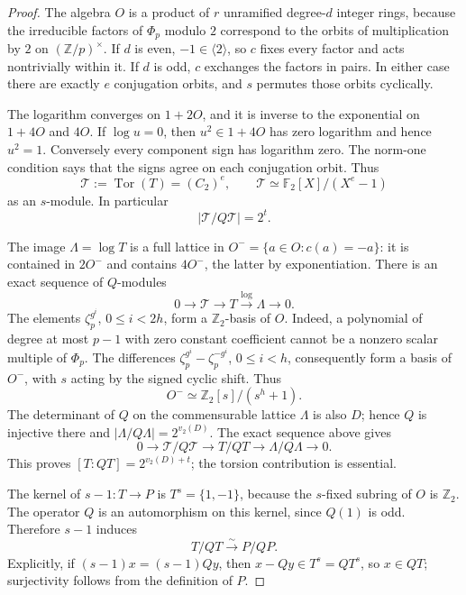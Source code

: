 \begin{proof}
The algebra \(O\) is a product of \(r\) unramified degree-\(d\) integer
rings, because the irreducible factors of \(\Phi_p\) modulo \(2\)
correspond to the orbits of multiplication by \(2\) on
\((\mathbb Z/p)^\times\).
If \(d\) is even, \(-1\in\langle2\rangle\), so \(c\) fixes every factor
and acts nontrivially within it.  If \(d\) is odd, \(c\) exchanges the
factors in pairs.  In either case there are exactly \(e\) conjugation
orbits, and \(s\) permutes those orbits cyclically.

The logarithm converges on \(1+2O\), and it is inverse to the exponential
on \(1+4O\) and \(4O\).
If \(\log u=0\), then \(u^2\in1+4O\) has zero logarithm and hence
\(u^2=1\).  Conversely every component sign has logarithm zero.
The norm-one condition says that the signs agree on each conjugation
orbit.  Thus
\[
 \mathcal T:=\operatorname{Tor}(T)=(C_2)^e,
 \qquad \mathcal T\simeq\mathbb F_2[X]/(X^e-1)
\]
as an \(s\)-module.  In particular
\[
 |\mathcal T/Q\mathcal T|=2^t.
\]

The image \(\Lambda=\log T\) is a full lattice in
\(O^-=\{a\in O:c(a)=-a\}\): it is contained in \(2O^-\) and contains
\(4O^-\), the latter by exponentiation.
There is an exact sequence of \(Q\)-modules
\[
 0\longrightarrow\mathcal T\longrightarrow T
       \xrightarrow{\log}\Lambda\longrightarrow0.
\]
The elements \(\zeta_p^{g^i}\), \(0\le i<2h\), form a
\(\mathbb Z_2\)-basis of \(O\).
Indeed, a polynomial of degree at most \(p-1\) with zero constant
coefficient cannot be a nonzero scalar multiple of \(\Phi_p\).
The differences
\(\zeta_p^{g^i}-\zeta_p^{-g^i}\), \(0\le i<h\), consequently form a
basis of \(O^-\), with \(s\) acting by the signed cyclic shift.
Thus
\[
 O^-\simeq\mathbb Z_2[s]/(s^h+1).
\]
The determinant of \(Q\) on the commensurable lattice \(\Lambda\)
is also \(D\); hence \(Q\) is injective there and
\(|\Lambda/Q\Lambda|=2^{v_2(D)}\).
The exact sequence above gives
\[
 0\longrightarrow\mathcal T/Q\mathcal T
 \longrightarrow T/QT
 \longrightarrow\Lambda/Q\Lambda\longrightarrow0.
\]
This proves \([T:QT]=2^{v_2(D)+t}\); the torsion contribution is
essential.

The kernel of \(s-1:T\to P\) is \(T^s=\{1,-1\}\), because the
\(s\)-fixed subring of \(O\) is \(\mathbb Z_2\).
The operator \(Q\) is an automorphism on this kernel, since \(Q(1)\)
is odd.  Therefore \(s-1\) induces
\[
 T/QT\xrightarrow{\sim}P/QP.
\]
Explicitly, if \((s-1)x=(s-1)Qy\), then
\(x-Qy\in T^s=QT^s\), so \(x\in QT\); surjectivity follows from
the definition of \(P\).


\end{proof}
